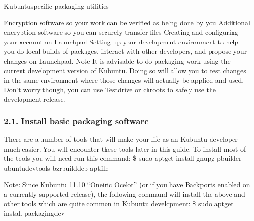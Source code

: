 \documentclass[letterpaper,10pt,english]{sphinxmanual}
\begin{document}
\sphinxAtStartPar
Kubuntu\sphinxhyphen{}specific packaging utilities

\sphinxAtStartPar
Encryption software so your work can be verified as being done by you
Additional encryption software so you can securely transfer files
Creating and configuring your account on Launchpad
Setting up your development environment to help you do local builds of packages, interact with other developers, and propose your changes on Launchpad.
Note
It is advisable to do packaging work using the current development version of Kubuntu. Doing so will allow you to test changes in the same environment where those changes will actually be applied and used.
Don’t worry though, you can use Testdrive or chroots to safely use the development release.


\subsubsection{2.1. Install basic packaging software}
\label{\detokenize{docs/packaging_guide/getting_started:install-basic-packaging-software}}
\sphinxAtStartPar
There are a number of tools that will make your life as an Kubuntu developer much easier. You will encounter these tools later in this guide. To install most of the tools you will need run this command:
\$ sudo apt\sphinxhyphen{}get install gnupg pbuilder ubuntu\sphinxhyphen{}dev\sphinxhyphen{}tools bzr\sphinxhyphen{}builddeb apt\sphinxhyphen{}file

\sphinxAtStartPar
Note: Since Kubuntu 11.10 “Oneiric Ocelot” (or if you have Backports enabled on a currently supported release), the following command will install the above and other tools which are quite common in Kubuntu development:
\$ sudo apt\sphinxhyphen{}get install packaging\sphinxhyphen{}dev
\end{document}
